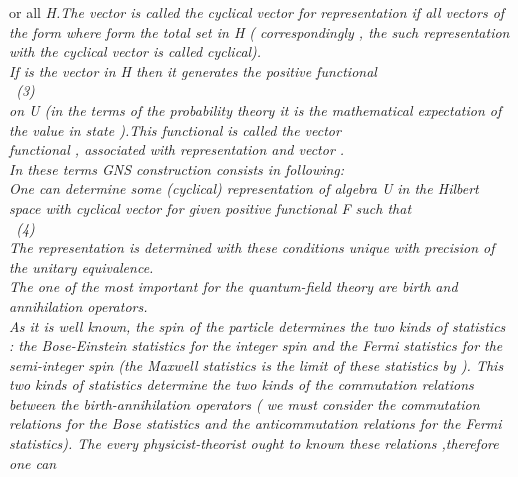 \documentclass[a4paper,12pt] {article}
\begin{document}
 \myHighlight{$\emptyset$}\coordHE{} or all \it H\rm.The vector \coordHE{} \rm  is called  \it the cyclical vector \rm for  representation \myHighlight{$ \pi$}\coordHE{} if all vectors of the form \coordHE{} where \coordHE{} form the total set in \it H\rm
 ( correspondingly , the such representation with the cyclical vector is called \it cyclical\rm  ).
\\If \myHighlight{$\Phi$}\coordHE{} is  the vector in  \it H \rm  then it generates the \it positive functional
\\\coordHE{} \rm \ (3) \\ on U (in the terms of the  probability theory it is the
 \it mathematical expectation \rm  of the value \coordHE{}   \it in  state  \myHighlight{$\Phi$}\coordHE{} \rm ).This functional is called
  \it the vector\\ functional , associated with  representation  \myHighlight{$\pi $}\coordHE{} \it  and   vector  \myHighlight{$\Phi$}\coordHE{}.
\\ \rm  In these terms  GNS construction consists in following:\\\it One can determine some (cyclical)
 representation  \coordHE{}  \it of algebra \rm U \it in the Hilbert space with cyclical   vector  \coordHE{} \it  for
 given positive functional \rm F  \it such that
  \\\coordHE{} \rm \  (4)\\ \it The representation   \coordHE{} \it is determined with
 these conditions unique with precision of the unitary equivalence.
\\ \rm The one of the most important for the quantum-field theory are  \it  birth and annihilation
operators.
\\ \rm  As it is well known, the spin of the particle determines the  two kinds of statistics : \it  the
 Bose-Einstein statistics for the integer spin and the Fermi statistics for the semi-integer spin \rm (the
  Maxwell statistics is the limit of these  statistics by \coordHE{} ). This two kinds of statistics
 determine the  two kinds of the commutation relations  between the birth-annihilation operators
( we must consider  the commutation relations  for the  Bose  statistics and the anticommutation relations
 for the  Fermi  statistics). The every physicist-theorist ought to known these relations ,therefore one can
\end{document}
